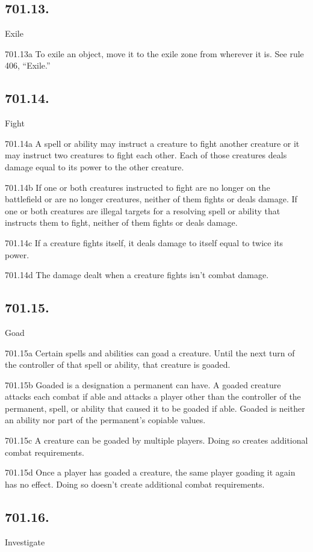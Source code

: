 \subsection*{701.13.}
Exile

701.13a To exile an object, move it to the exile zone from wherever it is. See rule 406, “Exile.”

\subsection*{701.14.}
Fight

701.14a A spell or ability may instruct a creature to fight another creature or it may instruct two creatures to fight each other. Each of those creatures deals damage equal to its power to the other creature.

701.14b If one or both creatures instructed to fight are no longer on the battlefield or are no longer creatures, neither of them fights or deals damage. If one or both creatures are illegal targets for a resolving spell or ability that instructs them to fight, neither of them fights or deals damage.

701.14c If a creature fights itself, it deals damage to itself equal to twice its power.

701.14d The damage dealt when a creature fights isn’t combat damage.

\subsection*{701.15.}
Goad

701.15a Certain spells and abilities can goad a creature. Until the next turn of the controller of that spell or ability, that creature is goaded.

701.15b Goaded is a designation a permanent can have. A goaded creature attacks each combat if able and attacks a player other than the controller of the permanent, spell, or ability that caused it to be goaded if able. Goaded is neither an ability nor part of the permanent’s copiable values.

701.15c A creature can be goaded by multiple players. Doing so creates additional combat requirements.

701.15d Once a player has goaded a creature, the same player goading it again has no effect. Doing so doesn’t create additional combat requirements.

\subsection*{701.16.}
Investigate


